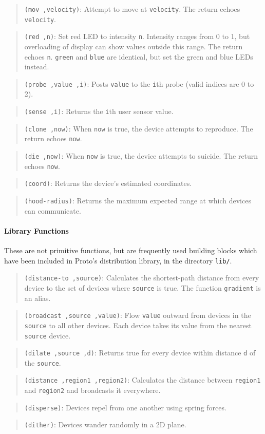 \documentclass{article}
\newcommand\function[2]
{\begin{quote}{\tt #1}: #2 \end{quote}}
\newcommand\var[1]{{\tt #1}}
\begin{document}
\function{(mov ,velocity)}{Attempt to move at \var{velocity}.  The
  return echoes \var{velocity}.}

\function{(red ,n)}{Set red LED to intensity \var{n}.  Intensity
  ranges from 0 to 1, but overloading of display can show values outside
  this range.  The return echoes \var{n}.  \var{green} and \var{blue}
  are identical, but set the green and blue LEDs instead.}

\function{(probe ,value ,i)}{Posts \var{value} to the \var{i}th probe
  (valid indices are 0 to 2).}

\function{(sense ,i)}{Returns the \var{i}th user sensor value.}

\function{(clone ,now)}{When \var{now} is true, the device attempts to
  reproduce.  The return echoes \var{now}.}

\function{(die ,now)}{When \var{now} is true, the device attempts to
  suicide.  The return echoes \var{now}.}

\function{(coord)}{Returns the device's estimated coordinates.}
\function{(hood-radius)}{Returns the maximum expected range at which
  devices can communicate.}

\paragraph{Library Functions}

These are not primitive functions, but are frequently used building
blocks which have been included in Proto's distribution library, in
the directory {\tt lib/}.

\function{(distance-to ,source)}{Calculates the shortest-path
  distance from every device to the set of devices where \var{source}
  is true.  The function \var{gradient} is an alias.}

\function{(broadcast ,source ,value)}{Flow \var{value} outward from
  devices in the \var{source} to all other devices.  Each device takes
  its value from the nearest \var{source} device.}

\function{(dilate ,source ,d)}{Returns true for every device within
  distance \var{d} of the \var{source}.}

\function{(distance ,region1 ,region2)}{Calculates the distance
  between \var{region1} and \var{region2} and broadcasts it
  everywhere.}

\function{(disperse)}{Devices repel from one another using spring
  forces.}

\function{(dither)}{Devices wander randomly in a 2D plane.}
\end{document}
